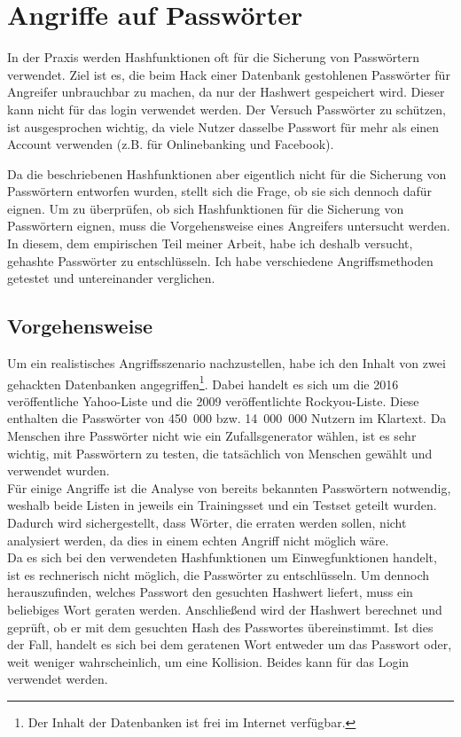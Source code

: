 \documentclass[12pt,a4paper]{scrartcl}
\numberwithin{equation}{section}
\numberwithin{myalgctr}{section}
\numberwithin{mytheoremctr}{section}
\begin{document}
	\newpage
	\section{Angriffe auf Passwörter}\label{angriffe}
	In der Praxis werden Hashfunktionen oft für die Sicherung von Passwörtern verwendet. Ziel ist es, die beim Hack einer Datenbank gestohlenen Passwörter für Angreifer unbrauchbar zu machen, da nur der Hashwert gespeichert wird. Dieser kann nicht für das login verwendet werden. Der Versuch Passwörter zu schützen, ist ausgesprochen wichtig, da viele Nutzer dasselbe Passwort für mehr als einen Account verwenden (z.B. für Onlinebanking und Facebook).\par\noindent
	Da die beschriebenen Hashfunktionen aber eigentlich nicht für die Sicherung von Passwörtern entworfen wurden, stellt sich die Frage, ob sie sich dennoch dafür eignen. 
	Um zu überprüfen, ob sich Hashfunktionen für die Sicherung von Passwörtern eignen, muss die Vorgehensweise eines Angreifers untersucht werden. In diesem, dem empirischen Teil meiner Arbeit, habe ich deshalb versucht, gehashte Passwörter zu entschlüsseln. %
	Ich habe verschiedene Angriffsmethoden getestet und untereinander verglichen. 
	\subsection{Vorgehensweise}
	Um ein realistisches Angriffsszenario nachzustellen, habe ich den Inhalt von zwei gehackten Datenbanken angegriffen\footnote{Der Inhalt der Datenbanken ist frei im Internet verfügbar.}. Dabei handelt es sich um die 2016 veröffentliche Yahoo-Liste und die 2009 veröffentlichte Rockyou-Liste. Diese enthalten die Passwörter von 450~000 bzw. 14~000~000 Nutzern im Klartext. Da Menschen ihre Passwörter nicht wie ein Zufallsgenerator wählen, ist es sehr wichtig, mit Passwörtern zu testen, die tatsächlich von Menschen gewählt und verwendet wurden.\\
	Für einige Angriffe ist die Analyse von bereits bekannten Passwörtern notwendig, weshalb beide Listen in jeweils ein Trainingsset und ein Testset geteilt wurden. Dadurch wird sichergestellt, dass Wörter, die erraten werden sollen, nicht analysiert werden, da dies in einem echten Angriff nicht möglich wäre.\\
	Da es sich bei den verwendeten Hashfunktionen um Einwegfunktionen handelt, ist es rechnerisch nicht möglich, die Passwörter zu entschlüsseln. Um dennoch herauszufinden, welches Passwort den gesuchten Hashwert liefert, muss ein beliebiges Wort geraten werden. Anschließend wird der Hashwert berechnet und geprüft, ob er mit dem gesuchten Hash des Passwortes übereinstimmt. Ist dies der Fall, handelt es sich bei dem geratenen Wort entweder um das Passwort oder, weit weniger wahrscheinlich, um eine Kollision. Beides kann für das Login verwendet werden.
\end{document}

